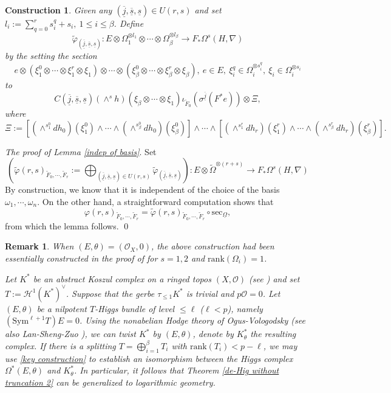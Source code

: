 \documentclass[12pt, a4paper]{article}
\newtheorem{remark}{Remark}[section]
\newtheorem{construction}{Construction}[section]
\begin{document}
\begin{construction}\label{tilde varphi}
  Given any $(\overline{\underline j},\underline{\overline s},\underline s)\in U(r,s)$ and set
$l_i:=\sum_{q=0}^rs^q_i+s_i,~1\leq i\leq\beta$. Define
$$
\tilde\varphi_{(\overline{\underline j},\overline{\underline s},\underline s)}:E\otimes\Omega_1^{\otimes l_1}\otimes\cdots\otimes\Omega_\beta^{\otimes l_\beta}
\to F_*\Omega^s(H,\nabla)
$$
by the setting the section
$$
e\otimes(\xi^0_1\otimes\cdots\otimes\xi^r_1\otimes\xi_1)\otimes\cdots\otimes(\xi^0_\beta\otimes\cdots\otimes\xi^r_\beta\otimes\xi_\beta),~e\in E,~\xi^q_i\in\Omega_i^{\otimes s^q_i},~\xi_i\in\Omega_i^{\otimes s_i}
$$
to
$$
 C(\overline{\underline j},\overline{\underline s},\underline s)(\wedge^sh)(\xi_\beta\otimes\cdots\otimes\xi_1)\iota_{\tilde F_0}(\sigma^{\underline{\overline j}}(F^*e))\otimes\Xi,
$$
where
$$
\Xi:=[(\wedge^{s^0_1}dh_0)(\xi^0_1)\wedge\cdots\wedge(\wedge^{s^0_\beta}dh_0)(\xi^0_\beta)]\wedge\cdots\wedge[(\wedge^{s^r_1}dh_r)(\xi^r_1)\wedge\cdots\wedge(\wedge^{s^r_\beta}dh_r)(\xi^r_\beta)].
$$
\end{construction}
\emph{The proof of Lemma \ref{indep of basis}}. Set
$$
(\tilde\varphi(r,s)_{\tilde F_0,\cdots,\tilde F_r}:=\bigoplus_{(\overline{\underline j},\underline{\overline s},\underline s)\in U(r,s)}\tilde\varphi_{(\overline{\underline j},\overline{\underline s},\underline s)}):E\otimes\tilde\Omega^{\otimes(r+s)}\to F_*\Omega^s(H,\nabla)
$$
By construction, we know that it is independent of the choice of the basis $\omega_1,\cdots,\omega_n$. On the other hand, a straightforward computation shows that 
$$
\varphi(r,s)_{\tilde F_0,\cdots,\tilde F_r}=\tilde\varphi(r,s)_{\tilde F_0,\cdots,\tilde F_r}\circ\mathrm{sec}_{\underline\Omega},
$$
from which the lemma follows. \qed

\begin{remark}
\upshape

When $(E,\theta)=(\mathcal O_X,0)$, the above construction had been essentially constructed in the proof of \cite[Theorem 3.9]{AS} for $s=1,2$ and $\mathrm{rank}(\Omega_i)=1$. 

 Let $ K^*$ be an abstract Koszul complex on a ringed topos $(X,\mathcal O)$ (see \cite[Definirion 2.1]{AS}) and set $T:=\mathcal H^1(K^*)^{\vee}$. Suppose that the gerbe $\tau_{\leq 1}K^*$ is trivial and $p\mathcal O=0$. Let $(E,\theta)$ be a nilpotent $T$-Higgs bundle of level $\leq\ell$ ($\ell<p$), namely $(\mathrm{Sym}^{\ell+1}T)E=0$. Using the nonabelian Hodge theory of Ogus-Vologodsky \cite{OV} (see also Lan-Sheng-Zuo \cite{LSZ}), we can twist $K^*$ by $(E,\theta)$, denote by $K^*_\theta$ the resulting complex. If there is a splitting $T=\bigoplus_{i=1}^\beta T_i$ with $\mathrm{rank}(T_i)<p-\ell$, we may use \eqref{key construction} to establish an isomorphism between the Higgs complex $\Omega^*(E,\theta)$ and $K^*_\theta$. In particular, it follows that Theorem \ref{de-Hig without truncation 2} can be generalized to logarithmic geometry.
\end{remark}
\end{document}
